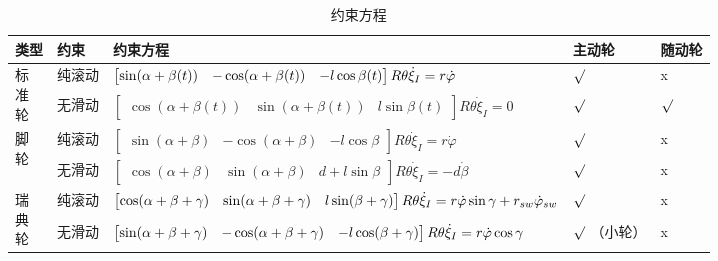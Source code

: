 \documentclass[
12pt, %
a4paper, 
oneside, %
headinclude,footinclude, %
]{scrartcl}
\begin{document}
\begin{table}[H]
\centering
\caption{约束方程}
\begin{tabular}{|p{0.9cm}|p{1.3cm}|p{10cm}|p{1.4cm}|p{1.3cm}|}
\hline
类型 & 约束 & 约束方程 & 主动轮 & 随动轮 \\
\hline
\multirow{2}{*}{\parbox[c]{0.9cm}{标\\准\\轮}} & 纯滚动 & $ \begin{bmatrix} \sin(\alpha + \beta(t)) & -\cos(\alpha + \beta(t)) & -l\cos\beta(t) \end{bmatrix} R\theta \dot{\xi}_I \newline = r\dot{\varphi} $ & $ \surd $ & x \\
\cline{2-5}
& 无滑动 & $ \begin{bmatrix} \cos(\alpha + \beta(t)) & \sin(\alpha + \beta(t)) & l\sin\beta(t) \end{bmatrix} R\theta \dot{\xi}_I = 0 $ & $ \surd $ & $ \surd $ \\
\hline
\multirow{2}{*}{\parbox[c]{0.9cm}{脚\\轮}} & 纯滚动 & $ \begin{bmatrix} \sin(\alpha + \beta) & -\cos(\alpha + \beta) & -l\cos\beta \end{bmatrix} R\theta \dot{\xi}_I = r\dot{\varphi} $ & $ \surd $ & x \\
\cline{2-5}
& 无滑动 & $ \begin{bmatrix} \cos(\alpha + \beta) & \sin(\alpha + \beta) & d + l\sin\beta \end{bmatrix} R\theta \dot{\xi}_I = -d\dot{\beta} $ & $ \surd $ & x \\
\hline
\multirow{2}{*}{\parbox[c]{0.9cm}{瑞\\典\\轮}} & 纯滚动 & $ \begin{bmatrix} \cos(\alpha + \beta + \gamma) & \sin(\alpha + \beta + \gamma) & l\sin(\beta + \gamma) \end{bmatrix} R\theta \dot{\xi}_I \newline = r\dot{\varphi}\sin\gamma + r_{sw}\dot{\varphi}_{sw} $ & $ \surd $ & x \\
\cline{2-5}
& 无滑动 & $ \begin{bmatrix} \sin(\alpha + \beta + \gamma) & -\cos(\alpha + \beta + \gamma) & -l\cos(\beta + \gamma) \end{bmatrix} R\theta \dot{\xi}_I \newline = r\dot{\varphi}\cos\gamma $ & $ \surd $ \newline（小轮） & x \\
\hline
\end{tabular}
\end{table}
\end{document}
